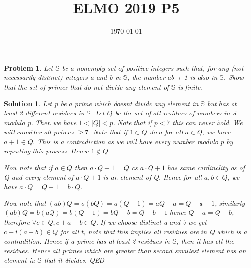 \documentclass{article}
\title{ELMO 2019 P5}
\date{\today}
\newtheorem*{problem}{Problem}
\newtheorem*{solution}{Solution}
\begin{document}
	
	\maketitle
	
	\begin{problem}
		Let $\mathbb{S}$ be a nonempty set of positive integers such
		that, for any (not necessarily distinct) integers a and b in $\mathbb{S}$, the number ab + 1 is also in $\mathbb{S}$.
		Show that the set of primes that do not divide any element of $\mathbb{S}$ is finite.
	\end{problem}
	
	\begin{solution}
		
		Let p be a prime which doesnt divide any element in $\mathbb{S}$ but has at least 2 different residues in $\mathbb{S}$. Let $Q$ be the set of all residues of numbers in S modulo p. Then we have $1<|Q|<p$. Note that  if $p<7$ this can never hold. We will consider all primes $\geq 7$. Note that if $1 \in Q$ then for all $a \in Q$, we have $a+1 \in Q$. This is a contradiction as we will have every number modulo p by repeating this process. Hence $1 \not \in Q$ .
		
		Now note that if $a \in Q$ then  $a \cdot Q +1 = Q$ as $a \cdot Q +1$ has same cardinality as of Q and every element of $a \cdot Q +1$ is an element of Q. Hence for all $a,b \in Q$, we have 
		$a \cdot Q = Q-1 = b \cdot Q$.
		
		Now note that $(ab)Q = a(bQ) = a(Q-1) = aQ- a = Q-a-1$, similarly $(ab)Q = b(aQ) = b(Q-1) = bQ- b = Q-b-1$ hence $Q-a = Q-b $, therefore  $\forall c \in Q , c+a-b \in Q$. If we choose distinct a and b we get $c+t(a-b) \in Q$ for all $t$, note that this implies all residues  are in Q which is a contradition.
		Hence if a prime has at least 2 residues in $\mathbb{S}$, then it has all the residues. Hence all primes which are greater than second smallest element has an element in $\mathbb{S}$ that it divides. QED

	\end{solution}
	
\end{document}
